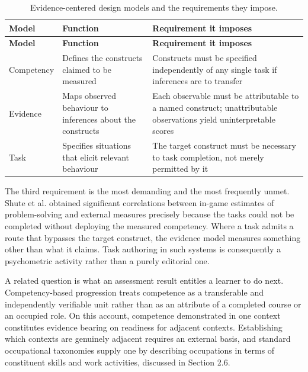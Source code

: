 {\small{}\renewcommand{\arraystretch}{1.1}
\begin{longtable}{|>{\raggedright\arraybackslash}p{}|>{\raggedright\arraybackslash}p{}|>{\raggedright\arraybackslash}p{}|}
\caption{Evidence-\allowbreak{}centered design models and the requirements they impose.} \\
\hline
\textbf{Model} & \textbf{Function} & \textbf{Requirement it imposes} \\ \hline
\endfirsthead
\hline
\textbf{Model} & \textbf{Function} & \textbf{Requirement it imposes} \\ \hline
\endhead
Competency & Defines the constructs claimed to be measured & Constructs must be specified independently of any single task if inferences are to transfer \\ \hline
Evidence & Maps observed behaviour to inferences about the constructs & Each observable must be attributable to a named construct; unattributable observations yield uninterpretable scores \\ \hline
Task & Specifies situations that elicit relevant behaviour & The target construct must be necessary to task completion, not merely permitted by it \\ \hline
\end{longtable}
}

The third requirement is the most demanding and the most frequently unmet. Shute et al.\cite{r21} obtained significant correlations between in-game estimates of problem-\allowbreak{}solving and external measures precisely because the tasks could not be completed without deploying the measured competency. Where a task admits a route that bypasses the target construct, the evidence model measures something other than what it claims. Task authoring in such systems is consequently a psychometric activity rather than a purely editorial one.

A related question is what an assessment result entitles a learner to do next. Competency-\allowbreak{}based progression\cite{r22} treats competence as a transferable and independently verifiable unit rather than as an attribute of a completed course or an occupied role. On this account, competence demonstrated in one context constitutes evidence bearing on readiness for adjacent contexts. Establishing which contexts are genuinely adjacent requires an external basis, and standard occupational taxonomies supply one by describing occupations in terms of constituent skills and work activities, discussed in Section 2.6.

